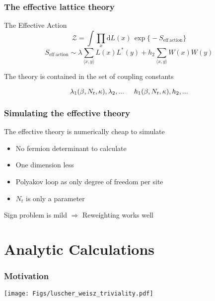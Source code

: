 \documentclass[12pt,a4paper,dvipsnames,usenames]{beamer}
\begin{document}
\begin{frame}
  \frametitle{The effective lattice theory}

  \begin{alertblock}{The Effective Action}
    \[
      \mathcal{Z} = \int \prod_x \mathrm{d} L(x) \, \exp \big\{ \minus S_{\mathrm{eff \: action}} \big\}
    \]
    \[
      S_{\mathrm{eff \: action}} \sim \lambda \sum_{\langle x, y \rangle} L(x) L^*(y) + h_2\sum_{\langle x, y \rangle} W(x) W(y)
    \]
  \end{alertblock}

  \vspace{1em}

  The theory is contained in the set of coupling constants

  \[
    \lambda_1(\beta, N_t, \kappa), \lambda_2, ... \hspace{.5cm} h_1(\beta,N_t,\kappa), h_2, ...
  \]

\end{frame}

\begin{frame}
  \frametitle{Simulating the effective theory}

  The effective theory is numerically cheap to simulate

  \vspace{.5cm}

  \begin{itemize}
    \setlength\itemsep{.5em}
    \item No fermion determinant to calculate
    \item One dimension less
    \item Polyakov loop as only degree of freedom per site
    \item $N_t$ is only a parameter
  \end{itemize}

  \vspace{.5cm}

  Sign problem is mild \;$\Rightarrow$\; Reweighting works well
  
  
\end{frame}

\section{Analytic Calculations}
\sectionframe

\begin{frame}
  \frametitle{Motivation}

  {\centering
    \texttt{[image: Figs/luscher\_weisz\_triviality.pdf]}
    \par}

  
\end{frame}
\end{document}
